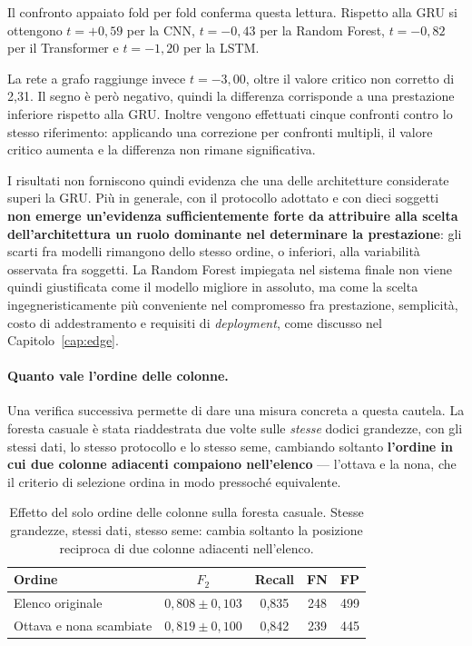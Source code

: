 Il confronto appaiato fold per fold conferma questa lettura. Rispetto alla GRU si ottengono $t=+0{,}59$ per la CNN, $t=-0{,}43$ per la Random Forest, $t=-0{,}82$ per il Transformer e $t=-1{,}20$ per la LSTM.

La rete a grafo raggiunge invece $t=-3{,}00$, oltre il valore critico non corretto di 2,31. Il segno è però negativo, quindi la differenza corrisponde a una prestazione inferiore rispetto alla GRU. Inoltre vengono effettuati cinque confronti contro lo stesso riferimento: applicando una correzione per confronti multipli, il valore critico aumenta e la differenza non rimane significativa.

I risultati non forniscono quindi evidenza che una delle architetture considerate superi la GRU. Più in generale, con il protocollo adottato e con dieci soggetti \textbf{non emerge un'evidenza sufficientemente forte da attribuire alla scelta dell'architettura un ruolo dominante nel determinare la prestazione}: gli scarti fra modelli rimangono dello stesso ordine, o inferiori, alla variabilità osservata fra soggetti. La Random Forest impiegata nel sistema finale non viene quindi giustificata come il modello migliore in assoluto, ma come la scelta ingegneristicamente più conveniente nel compromesso fra prestazione, semplicità, costo di addestramento e requisiti di \emph{deployment}, come discusso nel Capitolo~\ref{cap:edge}.

\paragraph{Quanto vale l'ordine delle colonne.}

Una verifica successiva permette di dare una misura concreta a questa cautela. La foresta casuale è stata riaddestrata due volte sulle \emph{stesse} dodici grandezze, con gli stessi dati, lo stesso protocollo e lo stesso seme, cambiando soltanto \textbf{l'ordine in cui due colonne adiacenti compaiono nell'elenco} --- l'ottava e la nona, che il criterio di selezione ordina in modo pressoché equivalente.

\begin{table}[ht]
\centering
\caption{Effetto del solo ordine delle colonne sulla foresta casuale. Stesse
grandezze, stessi dati, stesso seme: cambia soltanto la posizione reciproca
di due colonne adiacenti nell'elenco.}
\label{tab:ordine}
\begin{tabular}{lcccc}
\toprule
\textbf{Ordine} & \textbf{$F_2$} & \textbf{Recall} & \textbf{FN} & \textbf{FP} \\
\midrule
Elenco originale & $0{,}808 \pm 0{,}103$ & 0,835 & 248 & 499 \\
Ottava e nona scambiate & $0{,}819 \pm 0{,}100$ & 0,842 & 239 & 445 \\
\bottomrule
\end{tabular}
\end{table}

